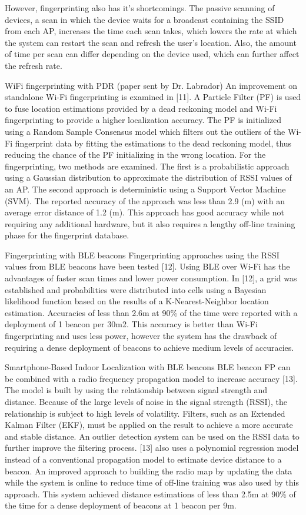 \documentclass[conference]{IEEEtran}
\begin{document}
However, fingerprinting also has it’s shortcomings. The passive scanning of devices, a scan in which the device waits for a broadcast containing the SSID from each AP, increases the time each scan takes, which lowers the rate at which the system can restart the scan and refresh the user’s location. Also, the amount of time per scan can differ depending on the device used, which can further affect the refresh rate.

WiFi fingerprinting with PDR (paper sent by Dr. Labrador)
An improvement on standalone Wi-Fi fingerprinting is examined in [11].  A Particle Filter (PF) is used to fuse location estimations provided by a dead reckoning model and Wi-Fi fingerprinting to provide a higher localization accuracy. The PF is initialized using a Random Sample Consensus model which filters out the outliers of the Wi-Fi fingerprint data by fitting the estimations to the dead reckoning model, thus reducing the chance of the PF initializing in the wrong location. For the fingerprinting, two methods are examined. The first is a probabilistic approach using a Gaussian distribution to approximate the distribution of RSSI values of an AP. The second approach is deterministic using a Support Vector Machine (SVM).  The reported accuracy of the approach was less than 2.9 (m) with an average error distance of 1.2 (m). This approach has good accuracy while not requiring any additional hardware, but it also requires a lengthy off-line training phase for the fingerprint database.

Fingerprinting with BLE beacons
Fingerprinting approaches using the RSSI values from BLE beacons have been tested [12]. Using BLE over Wi-Fi has the advantages of faster scan times and lower power consumption. In [12], a grid was established and probabilities were distributed into cells using a Bayesian likelihood function based on the results of a K-Nearest-Neighbor location estimation. Accuracies of less than 2.6m at 90\% of the time were reported with a deployment of 1 beacon per 30m2. This accuracy is better than Wi-Fi fingerprinting and uses less power, however the  system has the drawback of requiring a dense deployment of beacons to achieve medium levels of accuracies.

Smartphone-Based Indoor Localization with BLE beacons
BLE beacon FP can be combined with a radio frequency propagation model to increase accuracy [13]. The model is built by using the relationship between signal strength and distance. Because of the large levels of noise in the signal strength (RSSI), the relationship is subject to high levels of volatility. Filters, such as an Extended Kalman Filter (EKF), must be applied on the result to achieve a more accurate and stable distance. An outlier detection system can be used on the RSSI data to further improve the filtering process. [13] also uses a polynomial regression model instead of a conventional propagation model to estimate device distance to a beacon. An improved approach to building the radio map by updating the data while the system is online to reduce time of off-line training was also used by this approach. This system achieved distance estimations of less than 2.5m at 90\% of the time for a dense deployment of beacons at 1 beacon per 9m.
\end{document}
